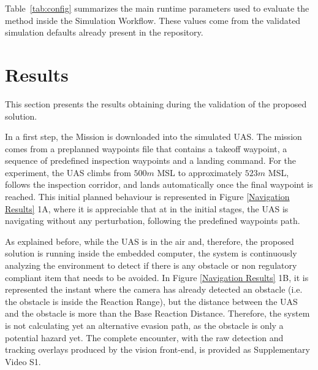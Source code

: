 \documentclass[drones,article,submit,moreauthors]{Definitions/mdpi}
\begin{document}


Table~\ref{tab:config} summarizes the main runtime parameters used to evaluate the method inside the Simulation Workflow. These values come from the validated simulation defaults already present in the repository.

\section{Results} 
This section presents the results obtaining during the validation of the proposed solution. 



In a first step, the Mission is downloaded into the simulated UAS. The mission comes from a preplanned waypoints file that contains a takeoff waypoint, a sequence of predefined inspection waypoints and a landing command. For the experiment, the UAS climbs from $500 m$ MSL to approximately $523 m$ MSL, follows the inspection corridor, and lands automatically once the final waypoint is reached. This initial planned behaviour is represented in Figure \ref{Navigation Results} 1A, where it is appreciable that at in the initial stages, the UAS is navigating without any perturbation, following the predefined waypoints path. 


As explained before, while the UAS is in the air and, therefore, the proposed solution is running inside the embedded computer, the system is continuously analyzing the environment to detect if there is any obstacle or non regulatory compliant item that needs to be avoided. In Figure \ref{Navigation Results} 1B, it is represented the instant where the camera has already detected an obstacle (i.e. the obstacle is inside the Reaction Range), but the distance between the UAS and the obstacle is more than the Base Reaction Distance. Therefore, the system is not calculating yet an alternative evasion path, as the obstacle is only a potential hazard yet. The complete encounter, with the raw detection and tracking overlays produced by the vision front-end, is provided as Supplementary Video S1.
\end{document}

